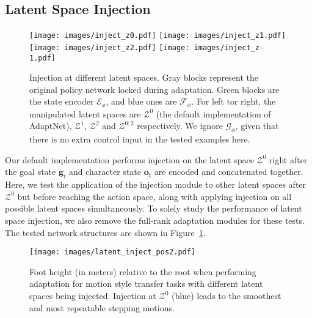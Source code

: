 \subsection{Latent Space Injection}\label{sec:exp_latent_inject}
\begin{figure}[t]
\centering
\texttt{[image: images/inject\_z0.pdf]}\hfill
\texttt{[image: images/inject\_z1.pdf]}\hfill
\texttt{[image: images/inject\_z2.pdf]}\hfill
\texttt{[image: images/inject\_z-1.pdf]}
    \caption{Injection at different latent spaces. Gray blocks represent the original policy network locked during adaptation. Green blocks are the state encoder $\mathcal{E}_\phi$, and blue ones are $\mathcal{F}_\phi$.
    For left tor right, the manipulated latent spaces are $\mathcal{Z}^0$ (the default implementation of AdaptNet), $\mathcal{Z}^1$, $\mathcal{Z}^2$ and $\mathcal{Z}^{0:2}$ respectively.
    We ignore $\mathcal{G}_\phi$, given that there is no extra control input in the tested examples here.} 
    \label{fig:network_inject_space}
\end{figure}

Our default implementation performs %
injection on the latent space $\mathcal{Z}^0$ right after the goal state $\mathbf{g}_t$ and character state $\mathbf{o}_t$ are encoded and concatenated together. 
Here, we test the application of the injection module to other latent spaces after $\mathcal{Z}^0$ but before reaching the action space, along with applying injection on all possible latent spaces simultaneously. 
To solely study the performance of latent space injection,
we also remove the full-rank adaptation modules 
for these tests.
The tested network structures are shown in Figure~\ref{fig:network_inject_space}.

\begin{figure}[t]
    \centering
    \texttt{[image: images/latent\_inject\_pos2.pdf]}
    \caption{Foot height (in meters) relative to the root when performing adaptation for motion style transfer tasks with different latent spaces being injected. Injection at $\mathcal{Z}^0$ (blue) leads to the smoothest and most repeatable stepping motions.}
    \label{fig:latent_inject_pos}
\end{figure}

